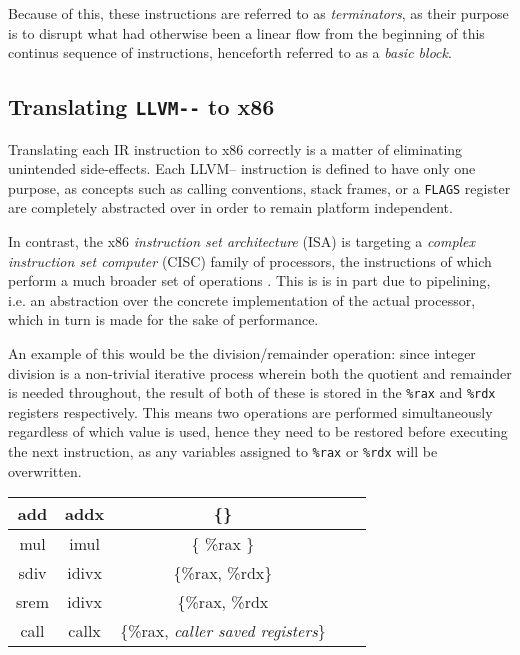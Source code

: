 \documentclass{article}
\begin{document}
Because of this, these instructions are referred to as \textit{terminators}, as their purpose is to disrupt what had otherwise been a linear flow from the beginning of this continus sequence of instructions, henceforth referred to as a \textit{basic block}.

\subsection{Translating \lstinline!LLVM--! to x86}

Translating each IR instruction to x86 correctly is a matter of eliminating unintended side-effects. Each LLVM-- instruction is defined to have only one purpose, %
as concepts such as calling conventions, stack frames, or a \lstinline!FLAGS! register are completely abstracted over in order to remain platform independent.

In contrast, the x86 \textit{instruction set architecture} (ISA) is targeting a  \textit{complex instruction set computer} (CISC) family of processors, the instructions of which perform a much broader set of operations \cite[p.~190]{tiger}. This is is in part due to pipelining, i.e. an abstraction over the concrete implementation of the actual processor, which in turn is made for the sake of performance.

An example of this would be the division/remainder operation: since integer division is a non-trivial iterative process wherein both the quotient and remainder is needed throughout, the result of both of these is stored in the \lstinline!%rax! and \lstinline!%rdx! registers respectively. This means two operations are performed simultaneously regardless of which value is used, hence they need to be restored before executing the next instruction, as any variables assigned to \lstinline!%rax! or \lstinline!%rdx! will be overwritten.

\begin{center}
\begin{tabular}{|c||c|c|c|c|} 
 \hline
 add & addx & \{\}\\
 \hline
 mul & imul & \{ \%rax \} \\
 \hline
 sdiv & idivx & \{\%rax, \%rdx\} \\
 \hline
 srem & idivx & \{\%rax, \%rdx \\
 \hline
   call & callx & \{\%rax, \textit{caller saved registers}\} \\
 \hline
 \hline
\end{tabular}
\end{center}
\end{document}
